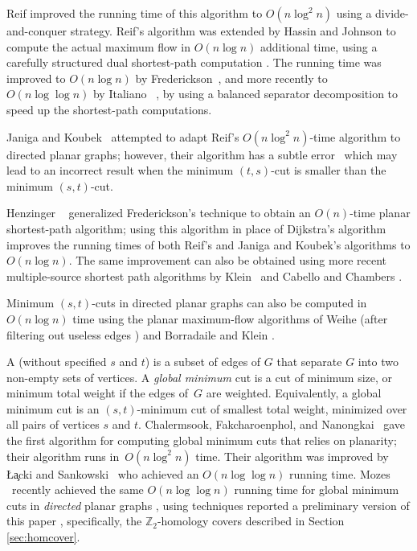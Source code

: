 \documentclass[11pt,twoside]{article}
\def\Z{\mathbb{Z}}
\begin{document}
Reif \cite{r-mstcp-83} improved the running time of this algorithm to $O(n\log^2 n)$ using a divide-and-conquer strategy.  Reif's algorithm was extended by Hassin and Johnson to compute the actual maximum flow in $O(n\log n)$ additional time, using a carefully structured dual shortest-path computation \cite{hj-oamfu-85}.  The running time was improved to $O(n\log n)$ by Frederickson~\cite{f-faspp-87}, and more recently to $O(n\log\log n)$ by Italiano \etal~\cite{insw-iamcmf-11}, by using a balanced separator decomposition to speed up the shortest-path computations.

Janiga and Koubek~\cite{jk-mcdpn-92} attempted to adapt Reif's $O(n\log^2 n)$-time algorithm to directed planar graphs; however, their  algorithm has a subtle error~\cite{kn-mcupg-11} which may lead to an incorrect result when the minimum $(t,s)$-cut is smaller than the minimum $(s,t)$-cut.

Henzinger \etal~\cite{hkrs-fspap-97} generalized Frederickson's technique to obtain an $O(n)$-time planar shortest-path algorithm; using this algorithm in place of Dijkstra's algorithm improves the running times of both Reif's and Janiga and Koubek's algorithms to $O(n\log n)$.  The same improvement can also be obtained using more recent multiple-source shortest path algorithms by Klein~\cite{k-msspp-05} and Cabello and Chambers \cite{cc-msspg-07}.

Minimum $(s,t)$-cuts in directed planar graphs can also be computed in $O(n\log n)$ time using the planar maximum-flow algorithms of Weihe \cite{w-mstfp-97} (after filtering out useless edges \cite{fls-fuadp-18}) and Borradaile and Klein \cite{b-epnfc-08, bk-tamfd-06, bk-amfdp-09}.

A  (without specified $s$ and $t$) is a subset of edges of $G$ that separate $G$ into two non-empty sets of vertices.
A \emph{global minimum} cut is a cut of minimum size, or minimum total weight if the edges of~$G$ are weighted.  Equivalently, a global minimum cut is an $(s,t)$-minimum cut of smallest total weight, minimized over all pairs of vertices $s$ and $t$.  Chalermsook, Fakcharoenphol, and Nanongkai~\cite{cfn-dnlta-04} gave the first algorithm for computing global minimum cuts that relies on planarity; their algorithm runs in~$O(n \log^2 n)$ time.  Their algorithm was improved by \L\c{a}cki and Sankowski~\cite{ls-mcsc-11} who achieved an $O(n \log \log n)$ running time.  Mozes \etal~recently achieved the same $O(n \log \log n)$ running time for global minimum cuts in \emph{directed} planar graphs \cite{mnnw-mdpgo-18},  using techniques reported  a preliminary version of this paper \cite{en-mcsnc-11}, specifically, the $\Z_2$-homology covers described in Section \ref{sec:homcover}.
\end{document}
